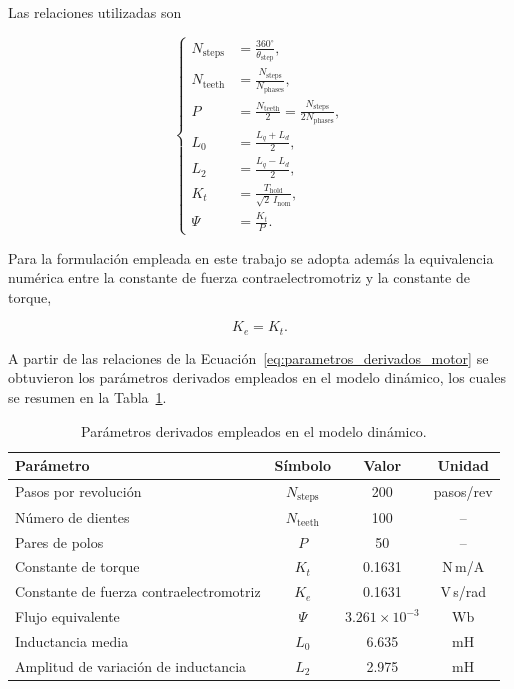 Las relaciones utilizadas son

\begin{equation}
\left\{
\begin{aligned}
N_{\mathrm{steps}}
    &= \frac{360^\circ}{\theta_{\mathrm{step}}}, \\[4pt]
N_{\mathrm{teeth}}
    &= \frac{N_{\mathrm{steps}}}
             {N_{\mathrm{phases}}}, \\[4pt]
P
    &= \frac{N_{\mathrm{teeth}}}{2}
     = \frac{N_{\mathrm{steps}}}
             {2N_{\mathrm{phases}}}, \\[4pt]
L_0
    &= \frac{L_q+L_d}{2}, \\[4pt]
L_2
    &= \frac{L_q-L_d}{2}, \\[4pt]
K_t
    &= \frac{T_{\mathrm{hold}}}
             {\sqrt{2}\,I_{\mathrm{nom}}}, \\[4pt]
\Psi
    &= \frac{K_t}{P}.
\end{aligned}
\right.
\label{eq:parametros_derivados_motor}
\end{equation}

Para la formulación empleada en este trabajo se adopta además la
equivalencia numérica entre la constante de fuerza contraelectromotriz
y la constante de torque,

\begin{equation}
    K_e = K_t.
\end{equation}

A partir de las relaciones de la
Ecuación~\eqref{eq:parametros_derivados_motor} se obtuvieron los
parámetros derivados empleados en el modelo dinámico, los cuales se
resumen en la Tabla~\ref{tab:parametros_derivados_motor}.

\begin{table}[htbp]
    \centering
    \caption{Parámetros derivados empleados en el modelo dinámico.}
    \label{tab:parametros_derivados_motor}
    \begin{tabular}{lccc}
        \hline
        \textbf{Parámetro} &
        \textbf{Símbolo} &
        \textbf{Valor} &
        \textbf{Unidad} \\
        \hline
        Pasos por revolución
            & $N_{\mathrm{steps}}$ & 200 & pasos/rev \\
        Número de dientes
            & $N_{\mathrm{teeth}}$ & 100 & -- \\
        Pares de polos
            & $P$ & 50 & -- \\
        Constante de torque
            & $K_t$ & 0.1631 & N\,m/A \\
        Constante de fuerza contraelectromotriz
            & $K_e$ & 0.1631 & V\,s/rad \\
        Flujo equivalente
            & $\Psi$ & $3.261\times10^{-3}$ & Wb \\
        Inductancia media
            & $L_0$ & 6.635 & mH \\
        Amplitud de variación de inductancia
            & $L_2$ & 2.975 & mH \\
        \hline
    \end{tabular}
\end{table}
